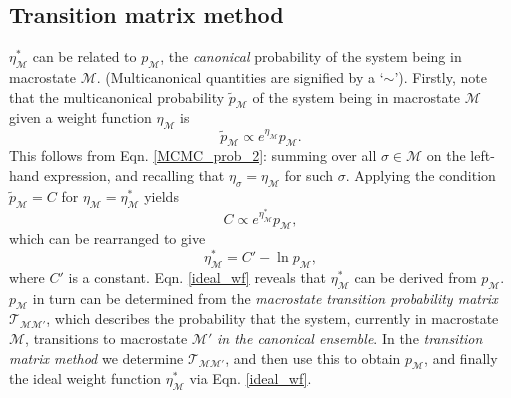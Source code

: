 \documentclass{report}
\begin{document}
\subsection{Transition matrix method}\label{sec:transition_matrix}
$\eta_{\mathcal{M}}^*$ can be related to $p_{\mathcal{M}}$, the \emph{canonical} probability of the system being in macrostate $\mathcal{M}$. (Multicanonical
quantities are signified by a `$\sim$'). Firstly, note that the multicanonical probability $\tilde{p}_{\mathcal{M}}$ of the system being in macrostate 
$\mathcal{M}$ given a weight function $\eta_{\mathcal{M}}$ is
\begin{equation}
\tilde{p}_{\mathcal{M}}\propto e^{\eta_{\mathcal{M}}}p_{\mathcal{M}}.
\end{equation}
This follows from Eqn. \eqref{MCMC_prob_2}: summing over all $\sigma\in\mathcal{M}$ on the left-hand expression, and recalling that 
$\eta_{\sigma}=\eta_{\mathcal{M}}$ for such $\sigma$. Applying the condition $\tilde{p}_{\mathcal{M}}=C$ for $\eta_{\mathcal{M}}=\eta_{\mathcal{M}}^*$ yields
\begin{equation}
C\propto e^{\eta^*_{\mathcal{M}}}p_{\mathcal{M}},
\end{equation}
which can be rearranged to give
\begin{equation}\label{ideal_wf}
\eta^*_{\mathcal{M}}=C'-\ln p_{\mathcal{M}},
\end{equation}
where $C'$ is a constant. Eqn. \eqref{ideal_wf} reveals that $\eta^*_{\mathcal{M}}$ can be derived from $p_{\mathcal{M}}$. $p_{\mathcal{M}}$ 
in turn can be determined from the \emph{macrostate transition probability matrix} $\mathcal{T}_{\mathcal{MM}'}$, which describes the probability that
the system, currently in macrostate $\mathcal{M}$, transitions to macrostate $\mathcal{M}'$ \emph{in the canonical ensemble}.
In the \emph{transition matrix method} \cite{Smith_1995,Fitzgerald_1999} we determine $\mathcal{T}_{\mathcal{MM}'}$, and then use this to obtain
$p_{\mathcal{M}}$, and finally the ideal weight function $\eta_{\mathcal{M}}^*$ via Eqn. \eqref{ideal_wf}.
\end{document}
